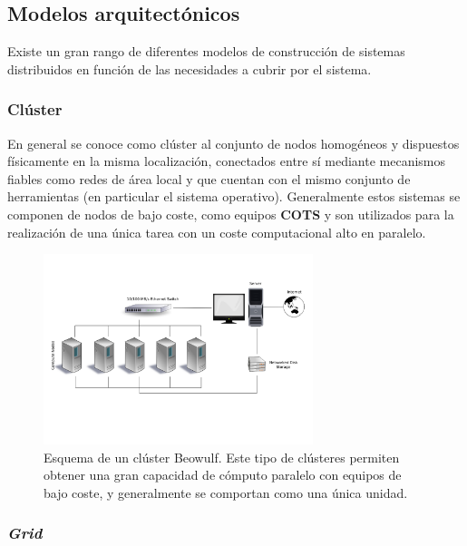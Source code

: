 \subsection{Modelos arquitectónicos}

Existe un gran rango de diferentes modelos de construcción de sistemas distribuidos en función de las necesidades a cubrir por el sistema.


\subsubsection{Clúster}

En general se conoce como clúster al conjunto de nodos homogéneos y dispuestos físicamente en la misma localización, conectados entre sí mediante mecanismos fiables como redes de área local y que cuentan con el mismo conjunto de herramientas (en particular el sistema operativo). Generalmente estos sistemas se componen de nodos de bajo coste, como equipos \textbf{COTS} y son utilizados para la realización de una única tarea con un coste computacional alto en paralelo.


\begin{figure}[H]
  \centering
  \includegraphics[width=0.7\textwidth]{Chapter2/Figures/Beowulf.png}
  \caption[Beowulf]{Esquema de un clúster Beowulf. Este tipo de clústeres permiten obtener una gran capacidad de cómputo paralelo con equipos de bajo coste, y generalmente se comportan como una única unidad.}
\label{fig:beowulf}
\end{figure}

\subsubsection{\textit{Grid}}

